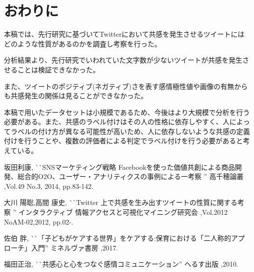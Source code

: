 \documentclass[dvipdfmx]{issj}
\begin{document}
\section{おわりに}  %

本稿では、先行研究に基づいてTwitterにおいて共感を発生させるツイートにはどのような性質があるのかを調査し考察を行った。

分析結果より、先行研究でいわれていた文字数が少ないツイートが共感を発生させることは検証できなかった。

また、ツイートのポジティブ(ネガティブ)さを表す感情極性値や画像の有無からも共感発生の関係は見ることができなかった。

本稿で用いたデータセットは小規模であるため、今後はより大規模で分析を行う必要がある。また、共感のラベル付けはその人の性格に依存しやすく、人によってラベルの付け方が異なる可能性が高いため、人に依存しないような共感の定義付けを行うことや、複数の評価者による判定でラベル付けを行う必要があると考えている。





\begin{thebibliography}{99}


   坂田利康, 
                       ^^ ^^ SNSマーケティング戦略 Facebookを使った価値共創による商品開発、総合的O2O、ユーザー・アナリティクスの事例による一考察 '' 
                       高千穂論叢 ,Vol.49 No.3, 2014, pp.83-142.

    大川 陽聡,高間 康史, 
                       ^^ ^^ Twitter 上で共感を生み出すツイートの性質に関する考察 '' 
                       インタラクティブ 情報アクセスと可視化マイニング研究会 ,Vol.2012 NoAM-02,2012, pp.02-.



   佐伯 胖,
                       ^^ ^^ 「子どもがケアする世界」をケアする:保育における「二人称的アプローチ」入門'' 
                       ミネルヴァ書房 ,2017.

   福田正治,
                       ^^ ^^ 共感心と心をつなぐ感情コミュニケーション'' 
                       へるす出版 ,2010.
  




\end{thebibliography}
\end{document}
